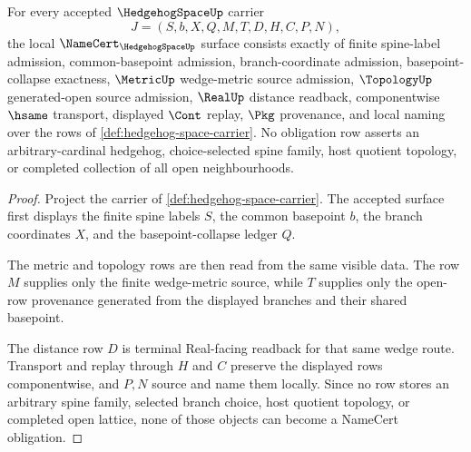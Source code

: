 \begin{theorem}
\label{thm:hedgehog-space-namecert-obligations}
For every accepted $\HedgehogSpaceUp$ carrier
$$
J=(S,b,X,Q,M,T,D,H,C,P,N),
$$
the local $\NameCert_{\HedgehogSpaceUp}$ surface consists exactly of finite
spine-label admission, common-basepoint admission, branch-coordinate
admission, basepoint-collapse exactness, $\MetricUp$ wedge-metric source
admission, $\TopologyUp$ generated-open source admission, $\RealUp$ distance
readback, componentwise $\hsame$ transport, displayed $\Cont$ replay, $\Pkg$
provenance, and local naming over the rows of
\autoref{def:hedgehog-space-carrier}. No obligation row asserts an
arbitrary-cardinal hedgehog, choice-selected spine family, host quotient
topology, or completed collection of all open neighbourhoods.
\end{theorem}
\begin{proof}
Project the carrier of \autoref{def:hedgehog-space-carrier}. The accepted
surface first displays the finite spine labels $S$, the common basepoint $b$,
the branch coordinates $X$, and the basepoint-collapse ledger $Q$.

The metric and topology rows are then read from the same visible data. The row
$M$ supplies only the finite wedge-metric source, while $T$ supplies only the
open-row provenance generated from the displayed branches and their shared
basepoint.

The distance row $D$ is terminal Real-facing readback for that same wedge
route. Transport and replay through $H$ and $C$ preserve the displayed rows
componentwise, and $P,N$ source and name them locally. Since no row stores an
arbitrary spine family, selected branch choice, host quotient topology, or
completed open lattice, none of those objects can become a NameCert
obligation.
\end{proof}

